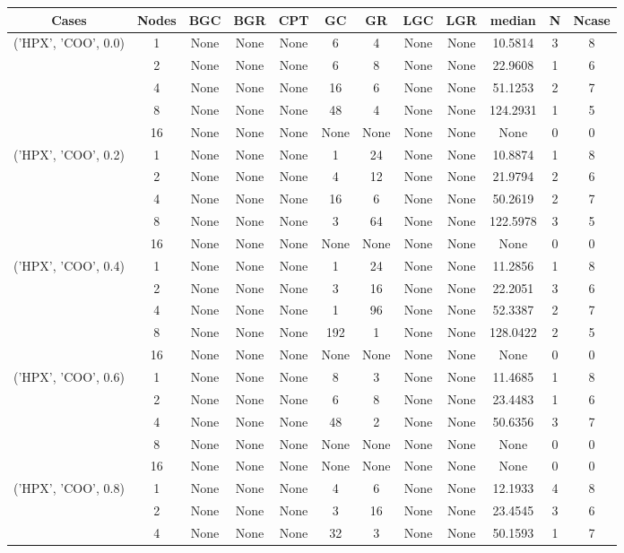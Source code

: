 \begin{tabular}{cccccccccccc}
\hline
Cases & Nodes& BGC& BGR& CPT& GC& GR& LGC& LGR& median & N & Ncase \\
\hline
\multirow{5}{*}{('HPX', 'COO', 0.0)}& 1& None& None& None& 6& 4& None& None& 10.5814& 3& 8\\
& 2& None& None& None& 6& 8& None& None& 22.9608& 1& 6\\
& 4& None& None& None& 16& 6& None& None& 51.1253& 2& 7\\
& 8& None& None& None& 48& 4& None& None& 124.2931& 1& 5\\
& 16& None& None& None& None& None& None& None& None& 0& 0\\
\hline
\multirow{5}{*}{('HPX', 'COO', 0.2)}& 1& None& None& None& 1& 24& None& None& 10.8874& 1& 8\\
& 2& None& None& None& 4& 12& None& None& 21.9794& 2& 6\\
& 4& None& None& None& 16& 6& None& None& 50.2619& 2& 7\\
& 8& None& None& None& 3& 64& None& None& 122.5978& 3& 5\\
& 16& None& None& None& None& None& None& None& None& 0& 0\\
\hline
\multirow{5}{*}{('HPX', 'COO', 0.4)}& 1& None& None& None& 1& 24& None& None& 11.2856& 1& 8\\
& 2& None& None& None& 3& 16& None& None& 22.2051& 3& 6\\
& 4& None& None& None& 1& 96& None& None& 52.3387& 2& 7\\
& 8& None& None& None& 192& 1& None& None& 128.0422& 2& 5\\
& 16& None& None& None& None& None& None& None& None& 0& 0\\
\hline
\multirow{5}{*}{('HPX', 'COO', 0.6)}& 1& None& None& None& 8& 3& None& None& 11.4685& 1& 8\\
& 2& None& None& None& 6& 8& None& None& 23.4483& 1& 6\\
& 4& None& None& None& 48& 2& None& None& 50.6356& 3& 7\\
& 8& None& None& None& None& None& None& None& None& 0& 0\\
& 16& None& None& None& None& None& None& None& None& 0& 0\\
\hline
\multirow{5}{*}{('HPX', 'COO', 0.8)}& 1& None& None& None& 4& 6& None& None& 12.1933& 4& 8\\
& 2& None& None& None& 3& 16& None& None& 23.4545& 3& 6\\
& 4& None& None& None& 32& 3& None& None& 50.1593& 1& 7\\

\end{tabular}
